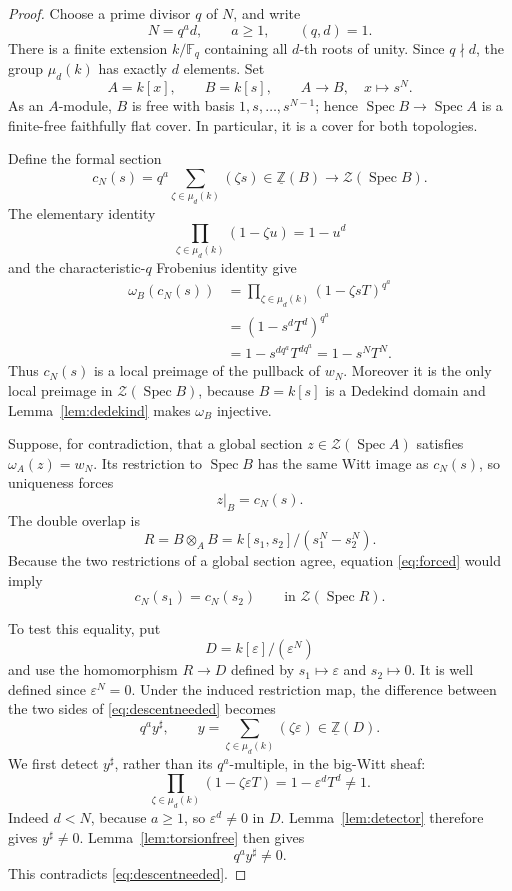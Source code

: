 \documentclass[11pt]{article}
\theoremstyle{definition}
\newcommand{\Spec}{\operatorname{Spec}}
\newcommand{\Zpre}{\underline{\mathbb Z}}
\newcommand{\Zsh}{\mathcal Z}
\newcommand{\sh}{\sharp}
\begin{document}
\begin{proof}
Choose a prime divisor \(q\) of \(N\), and write
\[
 N=q^a d,\qquad a\geq1,\qquad (q,d)=1.
 \tag{4.1}\label{eq:decompose}
\]
There is a finite extension \(k/\mathbb F_q\) containing all \(d\)-th
roots of unity.  Since \(q\nmid d\), the group
\(\mu_d(k)\) has exactly \(d\) elements.  Set
\[
 A=k[x],\qquad B=k[s],\qquad A\longrightarrow B,\quad x\longmapsto s^N.
 \tag{4.2}\label{eq:rootcover}
\]
As an \(A\)-module, \(B\) is free with basis
\(1,s,\ldots,s^{N-1}\); hence \(\Spec B\to\Spec A\) is a finite-free
faithfully flat cover.  In particular, it is a cover for both topologies.

Define the formal section
\[
 c_N(s)=q^a\sum_{\zeta\in\mu_d(k)}(\zeta s)
       \in\Zpre(B)\longrightarrow\Zsh(\Spec B).
 \tag{4.3}\label{eq:candidate}
\]
The elementary identity
\[
 \prod_{\zeta\in\mu_d(k)}(1-\zeta u)=1-u^d
 \tag{4.4}\label{eq:roots}
\]
and the characteristic-\(q\) Frobenius identity give
\begin{align*}
 \omega_B(c_N(s))
  &=\prod_{\zeta\in\mu_d(k)}(1-\zeta sT)^{q^a}\\
  &=(1-s^dT^d)^{q^a}\\
  &=1-s^{dq^a}T^{dq^a}
   =1-s^NT^N.
 \tag{4.5}\label{eq:localimage}
\end{align*}
Thus \(c_N(s)\) is a local preimage of the pullback of \(w_N\).
Moreover it is the only local preimage in \(\Zsh(\Spec B)\), because
\(B=k[s]\) is a Dedekind domain and Lemma~\ref{lem:dedekind} makes
\(\omega_B\) injective.

Suppose, for contradiction, that a global section
\(z\in\Zsh(\Spec A)\) satisfies \(\omega_A(z)=w_N\).  Its restriction to
\(\Spec B\) has the same Witt image as \(c_N(s)\), so uniqueness forces
\[
 z|_B=c_N(s).
 \tag{4.6}\label{eq:forced}
\]
The double overlap is
\[
 R=B\otimes_A B
   =k[s_1,s_2]/(s_1^N-s_2^N).
 \tag{4.7}\label{eq:overlap}
\]
Because the two restrictions of a global section agree, equation
\eqref{eq:forced} would imply
\[
 c_N(s_1)=c_N(s_2)\qquad\text{in }\Zsh(\Spec R).
 \tag{4.8}\label{eq:descentneeded}
\]

To test this equality, put
\[
 D=k[\varepsilon]/(\varepsilon^N)
 \tag{4.9}\label{eq:D}
\]
and use the homomorphism \(R\to D\) defined by
\(s_1\mapsto\varepsilon\) and \(s_2\mapsto0\).  It is well defined since
\(\varepsilon^N=0\).  Under the induced restriction map, the difference
between the two sides of \eqref{eq:descentneeded} becomes
\[
 q^a y^\sh,\qquad
 y=\sum_{\zeta\in\mu_d(k)}(\zeta\varepsilon)\in\Zpre(D).
 \tag{4.10}\label{eq:y}
\]
We first detect \(y^\sh\), rather than its \(q^a\)-multiple, in the
big-Witt sheaf:
\[
 \prod_{\zeta\in\mu_d(k)}(1-\zeta\varepsilon T)
   =1-\varepsilon^dT^d\ne1.
 \tag{4.11}\label{eq:detecty}
\]
Indeed \(d<N\), because \(a\geq1\), so
\(\varepsilon^d\ne0\) in \(D\).  Lemma~\ref{lem:detector} therefore gives
\(y^\sh\ne0\).  Lemma~\ref{lem:torsionfree} then gives
\[
 q^a y^\sh\ne0.
 \tag{4.12}\label{eq:qnonzero}
\]
This contradicts \eqref{eq:descentneeded}.


\end{proof}
\end{document}
